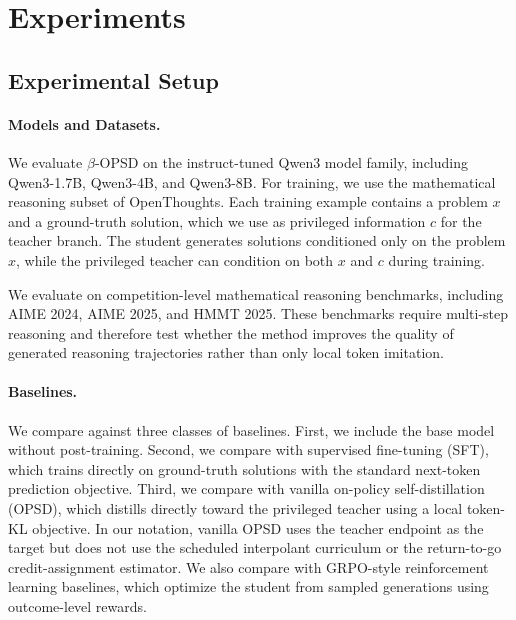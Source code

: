 \vspace{-2mm}
\section{Experiments}
\label{sec:experiments}

\subsection{Experimental Setup}
\label{sec:experimental_setup}

\paragraph{Models and Datasets.}
We evaluate $\beta$-OPSD on the instruct-tuned Qwen3 model family, including
Qwen3-1.7B, Qwen3-4B, and Qwen3-8B. For training, we use the mathematical reasoning
subset of OpenThoughts. Each training example contains a problem $x$ and a ground-truth
solution, which we use as privileged information $c$ for the teacher branch. The student
generates solutions conditioned only on the problem $x$, while the privileged teacher can
condition on both $x$ and $c$ during training.

We evaluate on competition-level mathematical reasoning benchmarks, including
AIME 2024, AIME 2025, and HMMT 2025. These benchmarks require multi-step reasoning
and therefore test whether the method improves the quality of generated reasoning
trajectories rather than only local token imitation.

\paragraph{Baselines.}
We compare against three classes of baselines. First, we include the base model without
post-training. Second, we compare with supervised fine-tuning (SFT), which trains directly
on ground-truth solutions with the standard next-token prediction objective. Third, we
compare with vanilla on-policy self-distillation (OPSD), which distills directly toward the
privileged teacher using a local token-KL objective. In our notation, vanilla OPSD uses the
teacher endpoint as the target but does not use the scheduled interpolant curriculum or the
return-to-go credit-assignment estimator. We also compare with GRPO-style reinforcement
learning baselines, which optimize the student from sampled generations using
outcome-level rewards.

